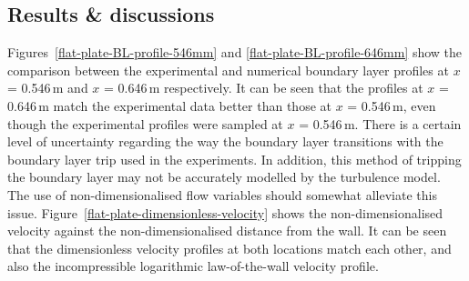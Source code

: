 \subsection{Results \& discussions}
\label{flat-plate-results-and-discussions}
%
Figures~\ref{flat-plate-BL-profile-546mm} and \ref{flat-plate-BL-profile-646mm} 
show the comparison between the experimental and numerical boundary layer 
profiles at $x$ = 0.546\,m and $x$ = 0.646\,m respectively. It can be seen that 
the profiles at $x$ = 0.646\,m match the experimental data better than those at 
$x$ = 0.546\,m, even though the experimental profiles were sampled at $x$ = 0.546\,m.
There is a certain level of uncertainty regarding the way the boundary layer transitions with
the boundary layer trip used in the experiments. In addition, this method of tripping the
boundary layer may not be accurately modelled by the turbulence model. The use of 
non-dimensionalised flow variables should somewhat alleviate this issue. 
Figure~\ref{flat-plate-dimensionless-velocity} shows the non-dimensionalised 
velocity against the non-dimensionalised distance from the wall. It can be
seen that the dimensionless velocity profiles at both locations match each other, and also the
incompressible logarithmic law-of-the-wall velocity profile.
%
